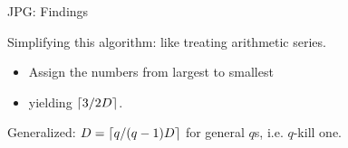 \begin{frame}{JPG: Findings}
 {
    Simplifying this algorithm: like treating arithmetic series.
    \begin{itemize}
        \item Assign the numbers from largest to smallest
        \item yielding $\left \lceil 3/2D \right\rceil$. 
    \end{itemize}
}

 {
    Generalized: $D=\left \lceil q/(q-1)D \right\rceil$ for general $q$s, i.e. $q$-kill one. 
}
    
\end{frame}

